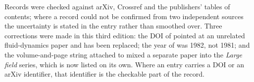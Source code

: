 \clearpage
{}

Records were checked against arXiv, Crossref and the publishers' tables of contents; where a record
could not be confirmed from two independent sources the uncertainty is stated in the entry rather
than smoothed over. Three corrections were made in this third edition: the DOI of
\cite{mrs} pointed at an unrelated fluid-dynamics paper and has been replaced; the year of
\cite{gopfert} was 1982, not 1981; and the volume-and-page string attached to \cite{balaban} mixed a
separate paper into the \emph{Large field} series, which is now listed on its own. Where an entry
carries a DOI or an arXiv identifier, that identifier is the checkable part of the record.

